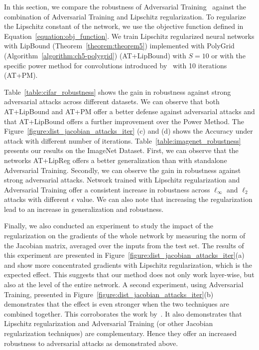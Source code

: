 In this section, we compare the robustness of Adversarial Training~\cite{goodfellow2014explaining, madry2018towards} against the combination of Adversarial Training and Lipschitz regularization.
To regularize the Lipschitz constant of the network, we use the objective function defined in Equation~\ref{equation:obj_function}.
We train Lipschitz regularized neural networks with LipBound (Theorem~\ref{theorem:theorem5}) implemented with PolyGrid (Algorithm~\ref{algorithm:ch5-polygrid}) (AT+LipBound) with $S = 10$ or with the specific power method for convolutions introduced by~\citet{farnia2018generalizable} with 10 iterations (AT+PM).

Table~\ref{table:cifar_robustness} shows the gain in robustness against strong adversarial attacks across different datasets.
We can observe that both AT+LipBound and AT+PM offer a better defense against adversarial attacks and that AT+LipBound offers a further improvement over the Power Method.
The Figure~\ref{figure:dist_jacobian_attacks_iter} (c) and (d) shows the Accuracy under attack with different number of iterations.
Table~\ref{table:imagenet_robustness} presents our results on the ImageNet Dataset.
First, we can observe that the networks AT+LipReg offers a better generalization than with standalone Adversarial Training.
Secondly, we can observe the gain in robustness against strong adversarial attacks. Network trained with Lipschitz regularization and Adversarial Training offer a consistent increase in robustness across $\ell_\infty$ and $\ell_2$ attacks with different $\epsilon$ value. We can also note that increasing the regularization lead to an increase in generalization and robustness.

Finally, we also conducted an experiment to study the impact of the regularization on the gradients of the whole network by measuring the norm of the Jacobian matrix, averaged over the inputs from the test set.
The results of this experiment are presented in Figure~\ref{figure:dist_jacobian_attacks_iter}(a) and show more concentrated gradients with  Lipschitz regularization, which is the expected effect.
This suggests that our method does not only work layer-wise, but also at the level of the entire network.
A second experiment, using Adversarial Training, presented in Figure~\ref{figure:dist_jacobian_attacks_iter}(b) demonstrates that the effect is even stronger when the two techniques are combined together.
This corroborates the work by~\citet{farnia2018generalizable}.
It also demonstrates that Lipschitz regularization and Adversarial Training (or other Jacobian regularization techniques) are complementary.
Hence they offer an increased robustness to adversarial attacks as demonstrated above.


